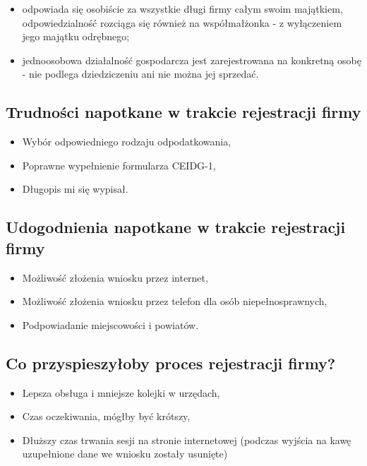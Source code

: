 \documentclass{sprawozdanie-agh}
\begin{document}
		\begin{itemize}
			\item odpowiada się osobiście za wszystkie długi firmy całym swoim majątkiem, odpowiedzialność rozciąga się również na współmałżonka - z wyłączeniem jego majątku odrębnego;
			\item jednoosobowa działalność gospodarcza jest zarejestrowana na konkretną osobę - nie podlega dziedziczeniu ani nie można jej sprzedać.
		\end{itemize}


		\subsection{Trudności napotkane w trakcie rejestracji firmy}

		\begin{itemize}
			\item Wybór odpowiedniego rodzaju odpodatkowania,
			\item Poprawne wypełnienie formularza CEIDG-1,
			\item Długopis mi się wypisał.
		\end{itemize}

		\subsection{Udogodnienia napotkane w trakcie rejestracji firmy}

		\begin{itemize}
			\item Możliwość złożenia wniosku przez internet,
			\item Możliwość złożenia wniosku przez telefon dla osób niepełnosprawnych,
			\item Podpowiadanie miejscowości i powiatów.
		\end{itemize}

		\subsection{Co przyspieszyłoby proces rejestracji firmy?}

		\begin{itemize}
			\item Lepsza obsługa i mniejsze kolejki w urzędach,
			\item Czas oczekiwania, mógłby być krótszy,
			\item Dłuższy czas trwania sesji na stronie internetowej (podczas wyjścia na kawę uzupełnione dane we wniosku zostały usunięte)
		\end{itemize}
\end{document}
